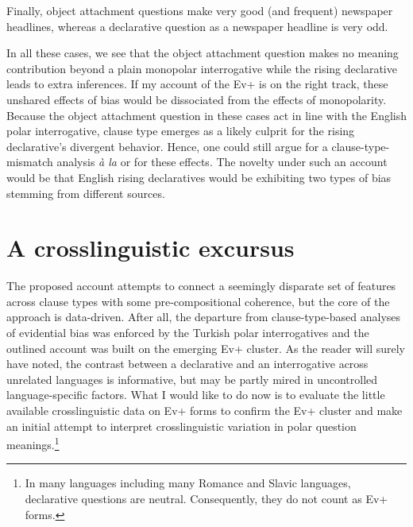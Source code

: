 \documentclass[output=paper,colorlinks,citecolor=brown]{langscibook}
\begin{document}
Finally, object attachment questions make very good (and frequent) newspaper headlines, whereas a declarative question as a newspaper headline is very odd.


In all these cases, we see that the object attachment question makes no meaning contribution beyond a plain monopolar interrogative while the rising declarative leads to extra inferences. If my account of the Ev+ is on the right track, these unshared effects of bias would be dissociated from the effects of monopolarity. Because the object attachment question in these cases act in line with the English polar interrogative, clause type emerges as a likely culprit for the rising declarative's divergent behavior. Hence, one could still argue for a clause-type-mismatch analysis \textit{\`a la} \citet{gunlogson} or \citet{farkas-roelofsen-division} for these effects. The novelty under such an account would be that English rising declaratives would be exhibiting two types of bias stemming from different sources. 



\section{A crosslinguistic excursus}\label{sec:11:5}

The proposed account attempts to connect a seemingly disparate set of features across clause types with some pre-compositional coherence, but the core of the approach is data-driven. After all, the departure from clause-type-based analyses of evidential bias was enforced by the Turkish polar interrogatives and the outlined account was built on the emerging Ev+ cluster. As the reader will surely have noted, the contrast between a declarative and an interrogative across unrelated languages is informative, but may be partly mired in uncontrolled language-specific factors. What I would like to do now is to evaluate the little available crosslinguistic data on Ev+ forms to confirm the Ev+ cluster and make an initial attempt to interpret crosslinguistic variation in polar question meanings.\footnote{In many languages including many Romance and Slavic languages, declarative questions are neutral. Consequently, they do not count as Ev+ forms.}
 
\end{document}
